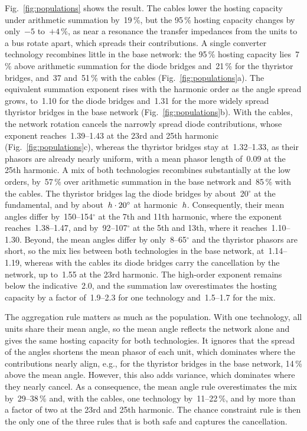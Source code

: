 Fig.~\ref{fig:populations} shows the result. The cables lower the hosting capacity under arithmetic summation by~19\,\%, but the 95\,\% hosting capacity changes by only~$-5$ to~$+4$\,\%, as near a resonance the transfer impedances from the units to a bus rotate apart, which spreads their contributions. A single converter technology recombines little in the base network: the 95\,\% hosting capacity lies~7\,\% above arithmetic summation for the diode bridges and~21\,\% for the thyristor bridges, and~37 and~51\,\% with the cables (Fig.~\ref{fig:populations}a). The equivalent summation exponent rises with the harmonic order as the angle spread grows, to~1.10 for the diode bridges and~1.31 for the more widely spread thyristor bridges in the base network (Fig.~\ref{fig:populations}b). With the cables, the network rotation cancels the narrowly spread diode contributions, whose exponent reaches~1.39--1.43 at the 23rd and 25th harmonic (Fig.~\ref{fig:populations}c), whereas the thyristor bridges stay at~1.32--1.33, as their phasors are already nearly uniform, with a mean phasor length of~0.09 at the 25th harmonic. A mix of both technologies recombines substantially at the low orders, by~57\,\% over arithmetic summation in the base network and~85\,\% with the cables. The thyristor bridges lag the diode bridges by about~20$^{\circ}$ at the fundamental, and by about~$h \cdot 20^{\circ}$ at harmonic~$h$. Consequently, their mean angles differ by~150--154$^{\circ}$ at the 7th and 11th harmonic, where the exponent reaches~1.38--1.47, and by~92--107$^{\circ}$ at the 5th and 13th, where it reaches~1.10--1.30. Beyond, the mean angles differ by only~8--65$^{\circ}$ and the thyristor phasors are short, so the mix lies between both technologies in the base network, at~1.14--1.19, whereas with the cables its diode bridges carry the cancellation by the network, up to~1.55 at the 23rd harmonic. The high-order exponent remains below the indicative~2.0, and the summation law overestimates the hosting capacity by a factor of~1.9--2.3 for one technology and~1.5--1.7 for the mix.

The aggregation rule matters as much as the population. With one technology, all units share their mean angle, so the mean angle reflects the network alone and gives the same hosting capacity for both technologies. It ignores that the spread of the angles shortens the mean phasor of each unit, which dominates where the contributions nearly align, e.g., for the thyristor bridges in the base network, 14\,\% above the mean angle. However, this also adds variance, which dominates where they nearly cancel. As a consequence, the mean angle rule overestimates the mix by~29--38\,\% and, with the cables, one technology by~11--22\,\%, and by more than a factor of two at the 23rd and 25th harmonic. The chance constraint rule is then the only one of the three rules that is both safe and captures the cancellation.

